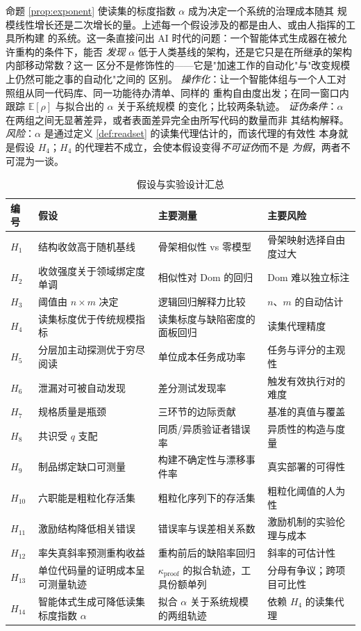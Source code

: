 \begin{hypothesis}[智能体式生成能否降低读集的标度指数]\label{hyp:h14}
命题 \ref{prop:exponent} 使读集的标度指数 $\alpha$ 成为决定一个系统的治理成本随其
规模线性增长还是二次增长的量。上述每一个假设涉及的都是由人、或由人指挥的工具所构建
的系统。这一条直接问出 AI 时代的问题：一个智能体式生成器在被允许重构的条件下，能否
\emph{发现} $\alpha$ 低于人类基线的架构，还是它只是在所继承的架构内部移动常数？这一
区分不是修饰性的——它是"加速工作的自动化"与"改变规模上仍然可能之事的自动化"之间的
区别。
\emph{操作化}：让一个智能体组与一个人工对照组从同一代码库、同一功能待办清单、同样的
重构自由度出发；在同一窗口内跟踪 $\mathbb{E}[\rho]$ 与拟合出的 $\alpha$ 关于系统规模
的变化；比较两条轨迹。
\emph{证伪条件}：$\alpha$ 在两组之间无显著差异，或者表面差异完全由所写代码的数量而非
其结构解释。
\emph{风险}：$\alpha$ 是通过定义 \ref{def:readset} 的读集代理估计的，而该代理的有效性
本身就是假设 $H_4$；$H_4$ 的代理若不成立，会使本假设变得\emph{不可证伪}而不是
\emph{为假}，两者不可混为一谈。
\end{hypothesis}

\begin{table}[htbp]
\centering
\footnotesize
\caption{假设与实验设计汇总}\label{tab:hypotheses}
\begin{tabular}{L{0.9cm}L{4.0cm}L{4.6cm}L{4.6cm}}
\toprule
\textbf{编号} & \textbf{假设} & \textbf{主要测量} & \textbf{主要风险} \\
\midrule
$H_1$ & 结构收敛高于随机基线 & 骨架相似性 vs 零模型 & 骨架映射选择自由度过大 \\
$H_2$ & 收敛强度关于领域绑定度单调 & 相似性对 $\mathrm{Dom}$ 的回归 &
  $\mathrm{Dom}$ 难以独立标注 \\
$H_3$ & 阈值由 $n\times m$ 决定 & 逻辑回归解释力比较 & $n$、$m$ 的自动估计 \\
$H_4$ & 读集标度优于传统规模指标 & 读集标度与缺陷密度的面板回归 & 读集代理精度 \\
$H_5$ & 分层加主动探测优于穷尽阅读 & 单位成本任务成功率 & 任务与评分的主观性 \\
$H_6$ & 泄漏对可被自动发现 & 差分测试发现率 & 触发有效执行对的难度 \\
$H_7$ & 规格质量是瓶颈 & 三环节的边际贡献 & 基准的真值与覆盖 \\
$H_8$ & 共识受 $q$ 支配 & 同质/异质验证者错误率 & 异质性的构造与度量 \\
$H_9$ & 制品绑定缺口可测量 & 构建不确定性与漂移事件率 & 真实部署的可得性 \\
$H_{10}$ & 六职能是粗粒化存活集 & 粗粒化序列下的存活集 & 粗粒化阈值的人为性 \\
$H_{11}$ & 激励结构降低相关错误 & 错误率与误差相关系数 & 激励机制的实验伦理与成本 \\
$H_{12}$ & 率失真斜率预测重构收益 & 重构前后的缺陷率回归 & 斜率的可估计性 \\
$H_{13}$ & 单位代码量的证明成本呈可测量轨迹 &
  $\kappa_{\text{proof}}$ 的拟合轨迹，工具份额单列 & 分母有争议；跨项目可比性 \\
$H_{14}$ & 智能体式生成可降低读集标度指数 $\alpha$ &
  拟合 $\alpha$ 关于系统规模的两组轨迹 & 依赖 $H_4$ 的读集代理 \\
\bottomrule
\end{tabular}
\end{table}

